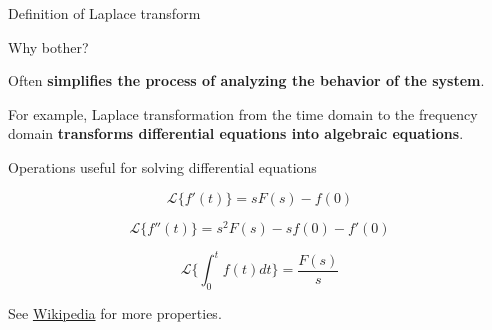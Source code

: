 \documentclass[compress]{beamer}
\begin{document}
\begin{frame}{Definition of Laplace transform}


     {

        Why bother?

        Often \textbf{simplifies the process of analyzing the behavior of the
        system}.

        For example, Laplace transformation from the time domain to the
        frequency domain \textbf{transforms differential equations into algebraic
        equations}.
    }
\end{frame}

\begin{frame}{Operations useful for solving differential equations}

\Large

\[
    \mathcal{L} \{f'(t)\} = sF(s) - f(0)
\]


\[
    \mathcal{L} \{f''(t)\} = s^2F(s) - sf(0) - f'(0)
\]


\[
    \mathcal{L} \{\int^{t}_{0}f(t)dt\} = \frac{F(s)}{s}
\]

\vspace{2em}
\small
See
    \href{https://en.wikipedia.org/wiki/Laplace_transform}{Wikipedia}
    for more properties.

\end{frame}
\end{document}
